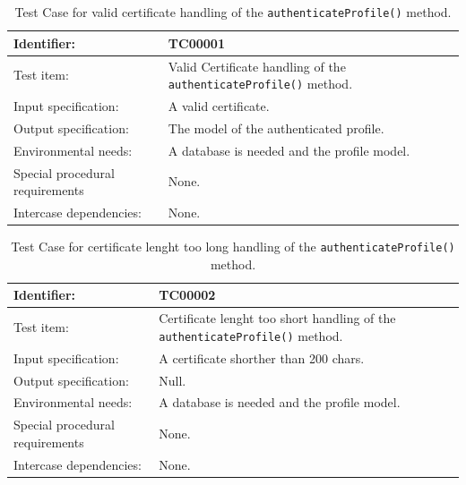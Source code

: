 \begin{table}[htbp]
	\centering
		\begin{tabular}{| p{4.5cm} | m{9cm} |}
			\hline
			Identifier: 					& TC00001 \\ \hline
			Test item:						& Valid Certificate handling of the \texttt{authenticateProfile()} method. \\ \hline
			Input specification:			& A valid certificate. \\ \hline
			Output specification: 			& The model of the authenticated profile. \\ \hline
			Environmental needs:			& A database is needed and the profile model. \\ \hline
			Special procedural requirements	& None. \\ \hline
			Intercase dependencies:			& None. \\ \hline
		\end{tabular}
	\caption{Test Case for valid certificate handling of the \texttt{authenticateProfile()} method.}
	\label{tab:TestCase_ValidCertificateHandling}
\end{table}

\begin{table}[htbp]
	\centering
		\begin{tabular}{| p{4.5cm} | m{9cm} |}
			\hline
			Identifier: 					& TC00002 \\ \hline
			Test item:						& Certificate lenght too short handling of the \texttt{authenticateProfile()} method. \\ \hline
			Input specification:			& A certificate shorther than 200 chars. \\ \hline
			Output specification: 			& Null. \\ \hline
			Environmental needs:			& A database is needed and the profile model. \\ \hline
			Special procedural requirements	& None. \\ \hline
			Intercase dependencies:			& None. \\ \hline
		\end{tabular}
	\caption{Test Case for certificate lenght too long handling of the \texttt{authenticateProfile()} method.}
	\label{tab:TestCase_CertificateToShortHandling}
\end{table}

